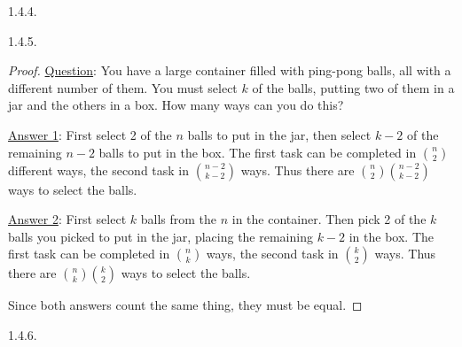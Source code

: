 \begin {itemize}
\begin{ans}{1.4.4.}
\end{ans}
\begin{ans}{1.4.5.}
		\begin{proof}
		\underline{Question}: You have a large container filled with ping-pong balls, all with a different number of them.  You must select $k$ of the balls, putting two of them in a jar and the others in a box.  How many ways can you do this?

		\underline{Answer 1}: First select 2 of the $n$ balls to put in the jar, then select $k-2$ of the remaining $n-2$ balls to put in the box.  The first task can be completed in ${n \choose 2}$ different ways, the second task in ${n-2 \choose k-2}$ ways.  Thus there are ${n \choose 2}{n-2 \choose k-2}$ ways to select the balls.

		\underline{Answer 2}:  First select $k$ balls from the $n$ in the container.  Then pick 2 of the $k$ balls you picked to put in the jar, placing the remaining $k-2$ in the box.  The first task can be completed in ${n \choose k}$ ways, the second task in ${k \choose 2}$ ways.  Thus there are ${n \choose k}{k \choose 2}$ ways to select the balls.

		Since both answers count the same thing, they must be equal.
		\end{proof}
	
\end{ans}
\begin{ans}{1.4.6.}
\end{ans}
\end{itemize}
